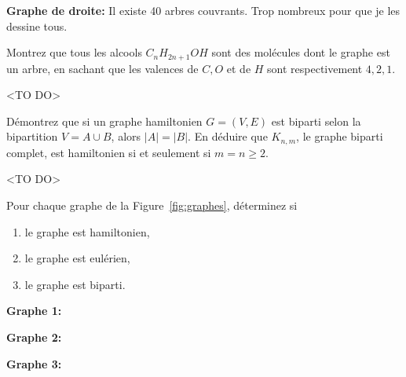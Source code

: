 \textbf{Graphe de droite:} Il existe 40 arbres couvrants. Trop nombreux pour que je les dessine tous.



\begin{exo}
Montrez que tous les alcools $C_nH_{2n+1}OH$ sont des mol\'ecules dont le graphe est un arbre, en sachant que les valences de $C, O$ et de $H$ sont respectivement $4, 2, 1$.
\end{exo}

<TO DO>


\begin{exo}
D\'emontrez que si un graphe hamiltonien $G = (V,E)$ est biparti selon la bipartition $V = A \cup B$, alors $|A|= |B|$. En d\'eduire que $K_{n,m}$, le graphe biparti complet, est hamiltonien si et seulement si $m=n \geq 2$.

\end{exo}

<TO DO>


\begin{exo}
Pour chaque graphe de la Figure~\ref{fig:graphes}, d\'eterminez si 
\begin{enumerate}
\item le graphe est hamiltonien,
\item le graphe est eul\'erien,
\item le graphe est biparti.
\end{enumerate}
\end{exo}




\textbf{Graphe 1:}

\textbf{Graphe 2:}

\textbf{Graphe 3:}


